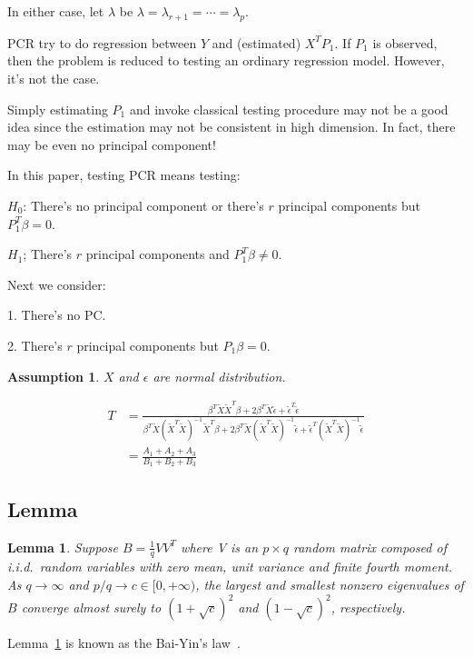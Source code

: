 \documentclass[review]{elsarticle}
\theoremstyle{plain}
\newtheorem{lemma}{Lemma}
\newtheorem{assumption}{\quad\quad Assumption}
\theoremstyle{definition}
\theoremstyle{remark}
\begin{document}
In either case, let $\lambda$ be $\lambda=\lambda_{r+1}=\cdots=\lambda_{p}$.

PCR try to do regression between $Y$ and (estimated) $X^T P_1$. If $P_1$ is observed, then the problem is reduced to testing an ordinary regression model. However, it's not the case.

Simply estimating $P_1$ and invoke classical testing procedure may not be a good idea since the estimation may not be consistent in high dimension. In fact, there may be even no principal component!

In this paper, testing PCR means testing:

$H_0$: There's no principal component or there's $r$ principal components but $P_1^T \beta =0$.

$H_1$; There's $r$ principal components and $P_1^T \beta \neq 0$.

Next we consider:

1. There's no PC.\@

2. There's $r$ principal components but $P_1\beta=0$.

\begin{assumption}\label{normal}
    $X$ and $\epsilon$ are normal distribution.
\end{assumption}


\begin{equation}
    \begin{aligned}
        T&=\frac{\beta^T \tilde{X}\tilde{X}^T \beta+
        2\beta^T \tilde{X}\tilde{\epsilon}+
        \tilde{\epsilon}^T\tilde{\epsilon}
    }{\beta^T \tilde{X}{(\tilde{X}^T\tilde{X})}^{-1}\tilde{X}^T \beta+
        2\beta^T \tilde{X}{(\tilde{X}^T\tilde{X})}^{-1}\tilde{\epsilon}+
        \tilde{\epsilon}^T{(\tilde{X}^T\tilde{X})}^{-1}\tilde{\epsilon}
    }\\
        &=\frac{A_1+A_2+A_3}{B_1+B_2+B_3}
    \end{aligned}
\end{equation}


\subsection{Lemma}

\begin{lemma}\label{baiyin}
    Suppose $B=\frac{1}{q}V V^T$ where V is an $p\times q$ random matrix composed of i.i.d.\  random variables with zero mean, unit variance and finite fourth moment. As $q\to \infty$ and $p/q \to c\in [0,+\infty)$, the largest and smallest nonzero eigenvalues of $B$ converge almost surely to ${(1+\sqrt{c})}^2$ and ${(1-\sqrt{c})}^2$, respectively.
\end{lemma}
Lemma~\ref{baiyin} is known as the Bai-Yin's law~\cite{Bai1993Limit}.
\end{document}
